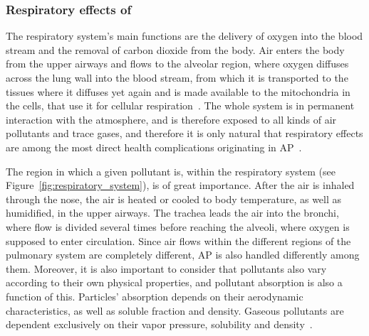 

\subsubsection{Respiratory effects of }%
\label{ssub:respiratory_system_ailments_related_to_ap}

The respiratory system's main functions are the delivery of oxygen into
the blood stream and the removal of carbon dioxide from the body. Air
enters the body from the upper airways and flows to the alveolar region,
where oxygen diffuses across the lung wall into the blood stream, from
which it is transported to the tissues where it diffuses yet again and
is made available to the mitochondria in the cells, that use it for
cellular respiration~\cite{Nilsson2010}. The whole system is in
permanent interaction with the atmosphere, and is therefore exposed to
all kinds of air pollutants and trace gases, and therefore it is only
natural that respiratory effects are among the most direct health
complications originating in \gls{AP}~\cite{Vallero2014}.

The region in which a given pollutant is, within the respiratory system
(see Figure~\ref{fig:respiratory_system}), is of great importance. After
the air is inhaled through the nose, the air is heated or cooled to body
temperature, as well as humidified, in the upper airways. The trachea
leads the air into the bronchi, where flow is divided several times
before reaching the alveoli, where oxygen is supposed to enter
circulation. Since air flows within the different regions of the
pulmonary system are completely different, \gls{AP} is also handled
differently among them. Moreover, it is also important to consider that
pollutants also vary according to their own physical properties, and
pollutant absorption is also a function of this.  Particles' absorption
depends on their aerodynamic characteristics, as well as soluble
fraction and density. Gaseous pollutants are dependent exclusively on
their vapor pressure, solubility and density~\cite{Nilsson2010,
Vallero2014}.

